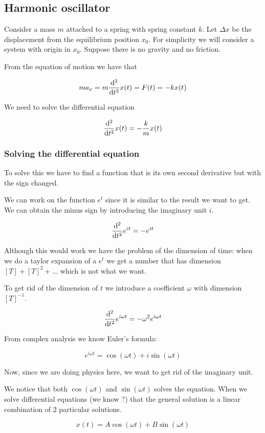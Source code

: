 \documentclass[10pt]{extarticle}
\begin{document}
\subsection{Harmonic oscillator}

Consider a mass $m$ attached to a spring with spring constant $k$. Let $\Delta x$ be the displacement from the equilibrium position $x_0$. For simplicity we will consider a system with origin in $x_0$. Suppose there is no gravity and no friction.

From the equation of motion we have that

$$
    m a_x = m \dv[2]{t}x(t) = F(t) = - k x(t)
$$

We need to solve the differential equation

$$
    \dv[2]{t}x(t) = - \frac{k}{m} x(t)
$$

\subsubsection{Solving the differential equation}

To solve this we have to find a function that is its own second derivative but with the sign changed.

We can work on the function $e^t$ since it is similar to the result we want to get. We can obtain the minus sign by introducing the imaginary unit $i$.

$$
    \dv[2]{t}e^{i t} = - e^{i t}
$$

Although this would work we have the problem of the dimension of time: when we do a taylor expansion of a $e^t$ we get a number that has dimension $[T] + [T]^2 + \dots$ which is not what we want.

To get rid of the dimension of $t$ we introduce a coefficient $\omega$ with dimension $[T]^{-1}$.

$$
    \dv[2]{t}e^{i \omega t} = - \omega^2 e^{i \omega t}
$$

From complex analysis we know Euler's formula:

$$
    e^{i \omega t} = \cos (\omega t) + i \sin (\omega t)
$$

Now, since we are doing physics here, we want to get rid of the imaginary unit.

We notice that both $\cos(\omega t)$ and $\sin(\omega t)$ solves the equation. When we solve differential equations (we know ?) that the general solution is a linear combination of 2 particular solutions.

$$
    x(t) = A \cos(\omega t) + B \sin(\omega t)
$$
\end{document}
